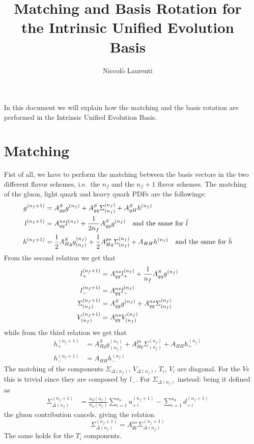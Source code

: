 \documentclass[a4paper,oneside]{article}
\title{Matching and Basis Rotation for the Intrinsic Unified Evolution Basis}
\author{Niccolò Laurenti}
\date{}
\begin{document}
\maketitle

In this document we will explain how the matching and the basis rotation are performed in the Intrinsic Unified Evolution Basis.

\section{Matching}
Fist of all, we have to perform the matching between the basis vectors in the two different flavor schemes, i.e.\ the $n_f$ and the $n_f+1$ flavor schemes. The matching of the gluon, light quark and heavy quark PDFs are the followings:
\begin{align*}
g^{(n_f+1)}&=A^S_{gg}g^{(n_f)}+A^S_{gq}\Sigma^{(n_f)}_{(n_f)}+A^S_{gH}h^{(n_f)} \\
l^{(n_f+1)} &= A^{ns}_{qq} l^{(n_f)} + {1\over2n_f} A^S_{qg}g^{(n_f)} \quad \text{and the same for $\bar{l}$}\\
h^{(n_f+1)} &= {1\over2} A^{S}_{Hg} g^{(n_f)}_{(n_f)}+ {1\over2} A^{ps}_{Hq} \Sigma^{(n_f)}_{(n_f)} + A_{HH}h^{(n_f)} \quad \text{and the same for $\bar{h}$}
\end{align*}
From the second relation we get that
\begin{align*}
l^{(n_f+1)}_+ &= A^{ns}_{qq} l^{(n_f)}_+ + {1\over n_f} A^S_{qg}g^{(n_f)} \\
l^{(n_f+1)}_- &= A^{ns}_{qq} l^{(n_f)}_- \\
\Sigma^{(n_f+1)}_{(n_f)}&=A^S_{qg}g^{(n_f)}+A^{ns}_{qq}\Sigma^{(n_f)}_{(n_f)} \\
V^{(n_f+1)}_{(n_f)}&=A^{ns}_{qq}V^{(n_f)}_{(n_f)}
\end{align*}
while from the third relation we get that
\begin{align*}
h^{(n_f+1)}_+ &= A^{S}_{Hg} g^{(n_f)}_{(n_f)}+A^{ps}_{Hq} \Sigma^{(n_f)}_{(n_f)} + A_{HH}h^{(n_f)}_+ \\
h^{(n_f+1)}_- &= A_{HH}h^{(n_f)}_-
\end{align*}
 The matching of the components $\Sigma_{\Delta(n_f)}$, $V_{\Delta(n_f)}$, $T_i$, $V_i$ are diagonal. For the $V$s this is trivial since they are composed by $l_-$. For $\Sigma_{\Delta(n_f)}$ instead: being it defined as
 \begin{align*}
 \Sigma^{(n_f+1)}_{\Delta(n_f)} & = \frac{n_d(n_f)}{n_u(n_f)} \sum_{i=1}^{n_u} u_{+\,i}^{(n_f+1)} - \sum_{i=1}^{n_d} d_{+\,i}^{(n_f+1)}
 \end{align*}
 the gluon contribution cancels, giving the relation
 \begin{equation*}
 \Sigma^{(n_f+1)}_{\Delta(n_f)}=A^{ns}_{qq}\Sigma^{(n_f+1)}_{\Delta(n_f)}
\end{equation*}
The same holds for the $T_i$ components.
\end{document}
